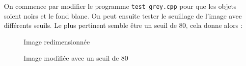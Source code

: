 \documentclass[french,a4paper,10pt]{article}
\begin{document}
	On commence par modifier le programme \texttt{test\_grey.cpp} pour que les objets soient noirs et le fond blanc.
	On peut ensuite tester le seuillage de l'image avec différents seuils.
	Le plus pertinent semble être un seuil de 80, cela donne alors :
	\begin{figure}[!htb]
		\begin{minipage}{0.48\textwidth}
			\centering
			\caption{Image redimensionnée}\label{Fig:resize-08-2}
		\end{minipage}\hfill
		\begin{minipage}{0.48\textwidth}
			\centering
			\caption{Image modifiée avec un seuil de 80}\label{Fig:test-grey-08}
		\end{minipage}
	\end{figure}
\end{document}
